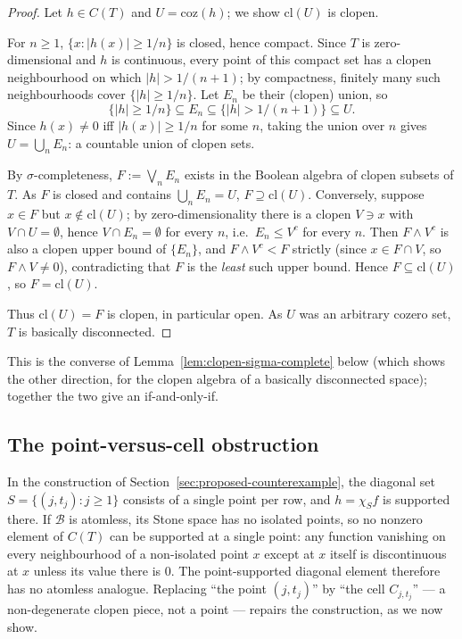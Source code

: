 \documentclass{amsart}
\theoremstyle{definition}
\theoremstyle{remark}
\newcommand{\cont}[1]{C\left(#1\right)}
\begin{document}
\begin{proof}
Let $h\in\cont{T}$ and $U=\mathrm{coz}(h)$; we show
$\mathrm{cl}(U)$ is clopen.

For $n\geq1$, $\{x:|h(x)|\geq1/n\}$ is closed, hence compact. Since $T$
is zero-dimensional and $h$ is continuous, every point of this compact
set has a clopen neighbourhood on which $|h|>1/(n+1)$; by compactness,
finitely many such neighbourhoods cover $\{|h|\geq1/n\}$. Let $E_n$ be
their (clopen) union, so
\[
\{|h|\geq1/n\}\subseteq E_n\subseteq\{|h|>1/(n+1)\}\subseteq U.
\]
Since $h(x)\neq0$ iff $|h(x)|\geq1/n$ for some $n$, taking the union
over $n$ gives $U=\bigcup_nE_n$: a countable union of clopen sets.

By $\sigma$-completeness, $F:=\bigvee_nE_n$ exists in the Boolean
algebra of clopen subsets of $T$. As $F$ is closed and contains
$\bigcup_nE_n=U$, $F\supseteq\mathrm{cl}(U)$. Conversely, suppose
$x\in F$ but $x\notin\mathrm{cl}(U)$; by zero-dimensionality there is a
clopen $V\ni x$ with $V\cap U=\emptyset$, hence $V\cap E_n=\emptyset$
for every $n$, i.e.\ $E_n\leq V^c$ for every $n$. Then $F\wedge V^c$ is
also a clopen upper bound of $\{E_n\}$, and $F\wedge V^c<F$ strictly
(since $x\in F\cap V$, so $F\wedge V\neq0$), contradicting that $F$ is
the \emph{least} such upper bound. Hence $F\subseteq\mathrm{cl}(U)$, so
$F=\mathrm{cl}(U)$.

Thus $\mathrm{cl}(U)=F$ is clopen, in particular open. As $U$ was an
arbitrary cozero set, $T$ is basically disconnected.
\end{proof}

This is the converse of Lemma~\ref{lem:clopen-sigma-complete} below
(which shows the other direction, for the clopen algebra of a basically
disconnected space); together the two give an if-and-only-if.

\subsection{The point-versus-cell obstruction}

In the construction of Section~\ref{sec:proposed-counterexample}, the
diagonal set $S=\{(j,t_j):j\geq1\}$ consists of a single point per row,
and $h=\chi_Sf$ is supported there. If $\mathcal B$ is atomless, its
Stone space has no isolated points, so no nonzero element of
$\cont{T}$ can be supported at a single point: any function
vanishing on every neighbourhood of a non-isolated point $x$ except at
$x$ itself is discontinuous at $x$ unless its value there is $0$. The
point-supported diagonal element therefore has no atomless analogue.
Replacing ``the point $(j,t_j)$'' by ``the cell $C_{j,t_j}$'' --- a
non-degenerate clopen piece, not a point --- repairs the construction, as
we now show.
\end{document}
